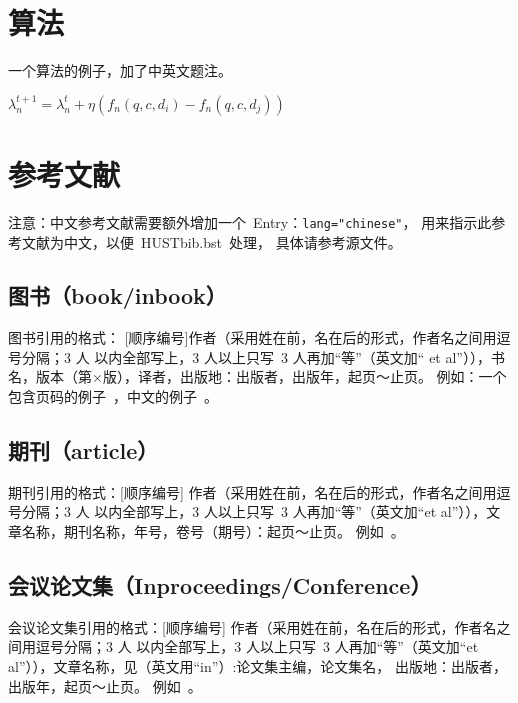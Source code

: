 \section{算法}
一个算法的例子，加了中英文题注。
\begin{minipage}{0.8\textwidth}\centering
\begin{algorithm}[H]
  { $\lambda^{t+1}_n = \lambda^t_n +
    \eta (f_n(q, c, d_i) - f_n(q, c, d_j))$ }
\end{algorithm}
\end{minipage}


\section{参考文献}

注意：中文参考文献需要额外增加一个~Entry：\verb|lang="chinese"|，
用来指示此参考文献为中文，以便~HUSTbib.bst~处理， 具体请参考源文件。

\subsection{图书（book/inbook）}

图书引用的格式：
[顺序编号]作者（采用姓在前，名在后的形式，作者名之间用逗号分隔；3 人
以内全部写上，3 人以上只写~3 人再加“等”（英文加“ et
al”）），书名，版本（第×版），译者，出版地：出版者，出版年，起页～止页。
例如：一个包含页码的例子~\cite{Collin}，中文的例子~\cite{jyzj1,jyzj2}。

\subsection{期刊（article）}

期刊引用的格式：[顺序编号]
作者（采用姓在前，名在后的形式，作者名之间用逗号分隔；3 人
以内全部写上，3 人以上只写~3 人再加“等”（英文加“et
al”）），文章名称，期刊名称，年号，卷号（期号）：起页～止页。
例如~。

\subsection{会议论文集（Inproceedings/Conference）}

会议论文集引用的格式：[顺序编号]
作者（采用姓在前，名在后的形式，作者名之间用逗号分隔；3 人
以内全部写上，3 人以上只写~3 人再加“等”（英文加“et
al”）），文章名称，见（英文用“in”）:论文集主编，论文集名，
出版地：出版者，出版年，起页～止页。
例如~。


